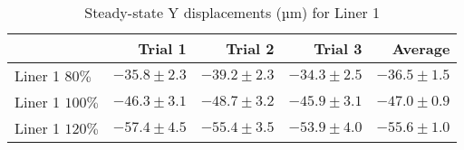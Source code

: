 \begin{table}[htbp!]
\centering
\begin{tabular}{lrrrr}
\toprule
  & Trial 1 & Trial 2 & Trial 3 & Average \\
\midrule
 Liner 1 $80\%$ & $-35.8 \pm 2.3$ & $-39.2 \pm 2.3$ & $-34.3 \pm 2.5$ & $-36.5 \pm 1.5$ \\
 Liner 1 $100\%$ & $-46.3 \pm 3.1$ & $-48.7 \pm 3.2$ & $-45.9 \pm 3.1$ & $-47.0 \pm 0.9$ \\
 Liner 1 $120\%$ & $-57.4 \pm 4.5$ & $-55.4 \pm 3.5$ & $-53.9 \pm 4.0$ & $-55.6 \pm 1.0$ \\
\bottomrule
\end{tabular}
\caption{Steady-state Y displacements (µm) for Liner 1}
\label{fig:liner_1_results_table}
\end{table}